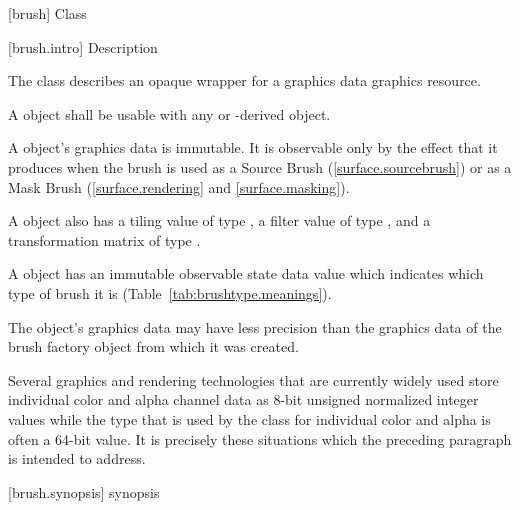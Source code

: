  [brush] {Class }

 [brush.intro] { Description}

\pnum
{}
The class  describes an opaque wrapper for a graphics data graphics resource.

\pnum
A  object shall be usable with any  or -derived object.

\pnum
A  object's graphics data is immutable. It is observable only by the effect that it produces when the brush is used as a Source Brush (\ref{surface.sourcebrush}) or as a Mask Brush (\ref{surface.rendering} and \ref{surface.masking}).

\pnum
A  object also has a tiling value of type , a filter value of type , and a transformation matrix of type .

\pnum
A  object has an immutable  observable state data value which indicates which type of brush it is (Table~\ref{tab:brushtype.meanings}).

\pnum
The  object's graphics data may have less precision than the graphics data of the brush factory object from which it was created.

\pnum
\enterexample
Several graphics and rendering technologies that are currently widely used store individual color and alpha channel data as 8-bit unsigned normalized integer values while the  type that is used by the  class for individual color and alpha is often a 64-bit value. It is precisely these situations which the preceding paragraph is intended to address.
\exitexample

 [brush.synopsis] { synopsis}

